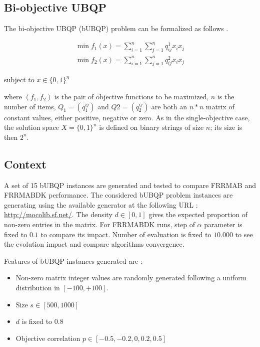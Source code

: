 \documentclass{article}
\begin{document}
    \subsection{Bi-objective UBQP}

    The bi-objective UBQP (bUBQP) problem can be formalized as follows \citep{DBLP:journals/asc/LiefoogheVH14}.

    \begin{equation} \label{eq:bUBQP} \tag{bUBQP}
    \begin{split}
        \min f_1(x) = \sum_{i=1}^{n} \sum_{j=1}^{n} q^1_{ij}x_ix_j \\
        \min f_2(x) = \sum_{i=1}^{n} \sum_{j=1}^{n} q^2_{ij}x_ix_j
    \end{split}
    \end{equation}

    \centerline{subject to $x \in \{0, 1\}^n$}

    \vspace{3mm}

    where $(f_1, f_2)$ is the pair of objective functions to be maximized, $n$ is the number
    of items, $Q_1 = (q^{ij}_1)$ and $Q2 = (q^{ij}_2)$ are both an $n*n$ matrix of constant values, either positive, negative or zero. As in the single-objective case, the solution
    space $X = \{0, 1\}^n$ is defined on binary strings of size $n$; its size is then $2^n$.

    \subsection{Context}

    A set of 15 bUBQP instances are generated and tested to compare FRRMAB and FRRMABDK performance. The considered bUBQP problem instances are generating using the available generator at the following URL : \url{http://mocolib.sf.net/}. The density $d \in [0, 1]$ gives the expected proportion of non-zero entries in the matrix. For FRRMABDK runs, step of $\alpha$ parameter is fixed to $0.1$ to compare its impact. Number of evaluation is fixed to $10.000$ to see the evolution impact and compare algorithms convergence.

    \vspace{3mm}

    Features of bUBQP instances generated are :
    \begin{itemize}
        \item Non-zero matrix integer values are randomly generated following a uniform distribution in $[-100, +100]$.
        \item Size $s \in [500, 1000]$
        \item $d$ is fixed to $0.8$
        \item Objective correlation $p \in [-0.5, -0.2, 0, 0.2, 0.5]$
    \end{itemize}
\end{document}
